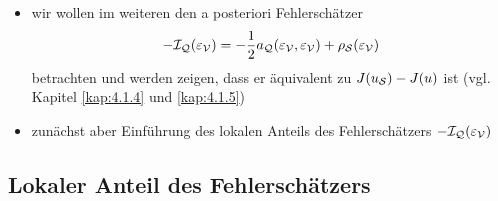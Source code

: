 \begin{itemize}
\begin{proof}
\underline{Fall 1:} Gilt $\lambda_k = 0$, so folgt aus \eqref{eq:4.13a}
\[
	\eps_{\mcal V} (x_{E_k}) = v_k = \frac {g_k}{a(\phi_{E_k},\phi_{E_k})} = \frac 1{\norm{\phi_{E_k}}^2} ((f,\phi_{E_k})-a(u_{\mcal S},\phi_{E_k})) \, .
\]
\underline{Fall 2:} Gilt $\lambda_k \not= 0$, dann folgt wegen \eqref{eq:4.13d}
\[
	\eps_{\mcal V} (x_{E_k}) =v_k = (\bs \psi - \bs u_{\mcal S})_k = \psi(x_{E_k}) - u_{\mcal S}(x_{E_k})\, .
\]
Insgesamt folgt mit \eqref{eq:4.13c} und \eqref{eq:4.12} die Behauptung.
\end{proof}

\item wir wollen im weiteren den a posteriori Fehlerschätzer
\[
	-\mathcal I_{\mathcal Q} (\varepsilon_{\mathcal V})= -\frac 1 2 a_{\mathcal Q}(\varepsilon_{\mathcal V},\varepsilon_{\mathcal V}) + \rho_{\mathcal S}(\varepsilon_{\mathcal V})
\]
betrachten und werden zeigen, dass er äquivalent zu $J(u_{\mathcal S}) - J(u)$ ist (vgl. Kapitel \ref{kap:4.1.4} und \ref{kap:4.1.5})

\item zunächst aber Einführung des lokalen Anteils des Fehlerschätzers $-\mathcal I_{\mathcal Q} (\varepsilon_{\mathcal V})$
\end{itemize}





\subsection{Lokaler Anteil des Fehlerschätzers}
\label{kap:4.1.2}

